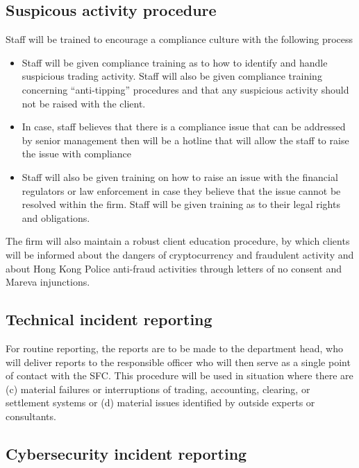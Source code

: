 \subsection{Suspicous activity procedure}

Staff will be trained to encourage a compliance culture with the
following process
\begin{itemize}
  \item Staff will be given compliance training as to how to identify
    and handle suspicious trading activity.  Staff will also be given
    compliance training concerning ``anti-tipping'' procedures and
    that any suspicious activity should not be raised with the client.
  \item In case, staff believes that there is a compliance issue that
    can be addressed by senior management then will be a hotline that
    will allow the staff to raise the issue with compliance
  \item Staff will also be given training on how to raise an issue
    with the financial regulators or law enforcement in case they
    believe that the issue cannot be resolved within the firm.  Staff
    will be given training as to their legal rights and obligations.
\end{itemize}

The firm will also maintain a robust client education procedure, by
which clients will be informed about the dangers of cryptocurrency and
fraudulent activity and about Hong Kong Police anti-fraud activities
through letters of no consent and Mareva injunctions.

\subsection{Technical incident reporting}

For routine reporting, the reports are to be made to the department
head, who will deliver reports to the responsible officer who will
then serve as a single point of contact with the SFC.  This procedure
will be used in situation where there are (c) material failures or
interruptions of trading, accounting, clearing, or settlement systems
or (d) material issues identified by outside experts or consultants.

\subsection{Cybersecurity incident reporting}

